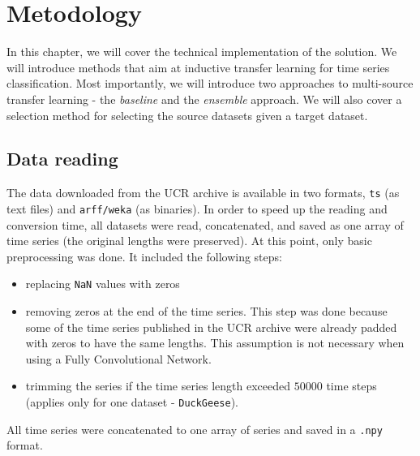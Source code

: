 \documentclass[a4paper,11pt,twoside]{report}
\theoremstyle{definition}
\begin{document}
\chapter{Metodology}
In this chapter, we will cover the technical implementation of the solution. We will introduce methods that aim at inductive transfer learning for time series classification. Most importantly, we will introduce two approaches to multi-source transfer learning - the \textit{baseline} and the \textit{ensemble} approach. We will also cover a selection method for selecting the source datasets given a target dataset.

\section{Data reading}\label{section:reading}
The data downloaded from the UCR archive is available in two formats, \texttt{ts} (as text files) and \texttt{arff/weka} (as binaries). In order to speed up the reading and conversion time, all datasets were read, concatenated, and saved as one array of time series (the original lengths were preserved). At this point, only basic preprocessing was done. It included the following steps:
\begin{itemize}
\item replacing \texttt{NaN} values with zeros
\item removing zeros at the end of the time series. This step was done because some of the time series published in the UCR archive were already padded with zeros to have the same lengths. This assumption is not necessary when using a Fully Convolutional Network.
\item trimming the series if the time series length exceeded $50 000$ time steps (applies only for one dataset - \texttt{DuckGeese}).


\end{itemize}

All time series were concatenated to one array of series and saved in a \texttt{.npy} format.
\end{document}
